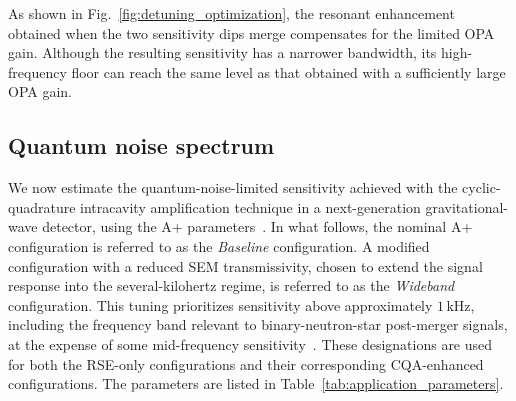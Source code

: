 \documentclass{iopjournal}
\begin{document}
As shown in Fig.~\ref{fig:detuning_optimization}, the resonant enhancement obtained when the two sensitivity dips merge compensates for the limited OPA gain. Although the resulting sensitivity has a narrower bandwidth, its high-frequency floor can reach the same level as that obtained with a sufficiently large OPA gain.

\subsection{Quantum noise spectrum}
\label{sec:application}

We now estimate the quantum-noise-limited sensitivity achieved with the cyclic-quadrature intracavity amplification technique in a next-generation gravitational-wave detector, using the A+ parameters~\cite{LIGOPostO5}. In what follows, the nominal A+ configuration is referred to as the {\it Baseline} configuration. A modified configuration with a reduced SEM transmissivity, chosen to extend the signal response into the several-kilohertz regime, is referred to as the {\it Wideband} configuration.
This tuning prioritizes sensitivity above approximately \(1\,\mathrm{kHz}\), including the frequency band relevant to binary-neutron-star post-merger signals, at the expense of some mid-frequency sensitivity~\cite{LIGOPostO5}.
These designations are used for both the RSE-only configurations and their corresponding CQA-enhanced configurations. The parameters are listed in Table~\ref{tab:application_parameters}.
\end{document}
